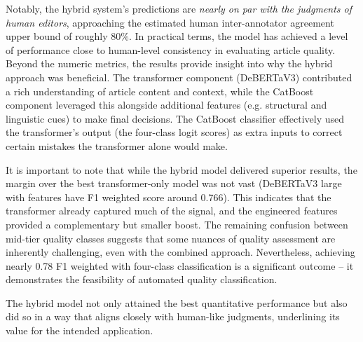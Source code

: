 Notably, the hybrid system’s predictions are \textit{nearly on par with the judgments of human editors}, approaching the estimated human inter-annotator agreement upper bound of roughly 80\%. In practical terms, the model has achieved a level of performance close to human-level consistency in evaluating article quality. Beyond the numeric metrics, the results provide insight into why the hybrid approach was beneficial. The transformer component (\ac{DeBERTaV3}) contributed a rich understanding of article content and context, while the \ac{CatBoost} component leveraged this alongside additional features (e.g. structural and linguistic cues) to make final decisions. The \ac{CatBoost} classifier effectively used the transformer’s output (the four-class logit scores) as extra inputs to correct certain mistakes the transformer alone would make.

It is important to note that while the hybrid model delivered superior results, the margin over the best transformer-only model was not vast (DeBERTaV3 large with features have F1 weighted score around 0.766). This indicates that the transformer already captured much of the signal, and the engineered features provided a complementary but smaller boost. The remaining confusion between mid-tier quality classes suggests that some nuances of quality assessment are inherently challenging, even with the combined approach. Nevertheless, achieving nearly 0.78 F1 weighted with four-class classification is a significant outcome – it demonstrates the feasibility of automated quality classification. 

The hybrid model not only attained the best quantitative performance but also did so in a way that aligns closely with human-like judgments, underlining its value for the intended application.

